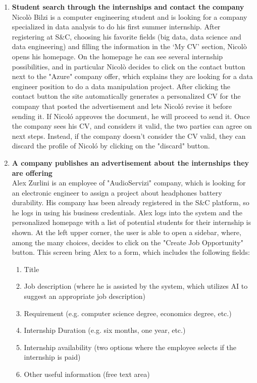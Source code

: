 \begin{enumerate}
      \item \textbf{Student search through the internships and contact the company}\\
     Nicolò Bilzi is a computer engineering student and is looking for a company specialized in data analysis to do his first summer internship. After registering at S\&C, choosing his favorite fields (big data, data science and data engineering) and filling the information in the ‘My CV’ section, Nicolò opens his homepage.
     On the homepage he can see several internship possibilities, and in particular Nicolò decides to click on the contact button next to the "Azure" company offer, which explains they are looking for a data engineer position to do a data manipulation project. After clicking the contact button the site automatically generates a personalized CV for the company that posted the advertisement and lets Nicoló revise it before sending it. If Nicoló approves the document, he will proceed to send it. Once the company sees his CV, and considers it valid, the two parties can agree on next steps. Instead, if the company doesn't consider the CV valid, they can discard the profile of Nicoló by clicking on the "discard" button.
      
      \item \textbf{A company publishes an advertisement about the internships they are offering}\\
    Alex Zurlini is an employee of "AudioServizi" company, which is looking for an electronic engineer to assign a project about headphones battery durability.
    His company has been already registered in the S\&C platform, so he logs in using his business credentials.
    Alex logs into the system and the personalized homepage with a list of potential students for their internship is shown.
    At the left upper corner, the user is able to open a sidebar, where, among the many choices, decides to click on the "Create Job Opportunity" button. 
    This screen bring Alex to a form, which includes the following fields:
    \begin{enumerate}
      \item Title 
      \item Job description (where he is assisted by the system, which utilizes AI to suggest an appropriate job description)
      \item Requirement (e.g. computer science degree, economics degree, etc.)
      \item Internship Duration (e.g. six months, one year, etc.)
      \item Internship availability (two options where the employee selects if the internship is paid)
      \item Other useful information (free text area)
    \end{enumerate}    


\end{enumerate}
